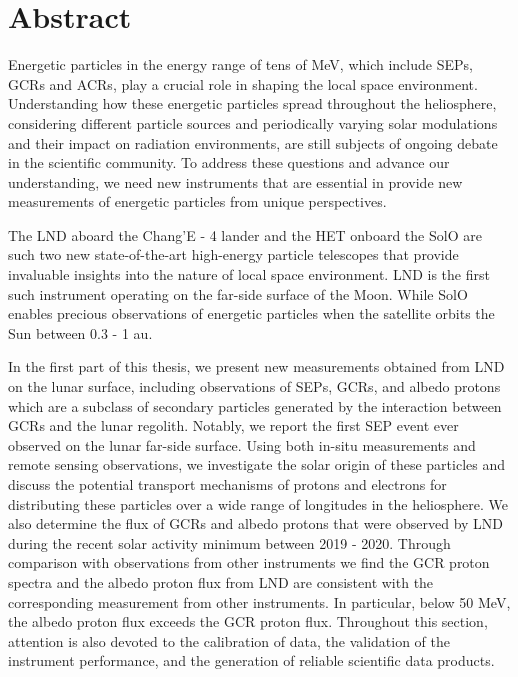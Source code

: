 \chapter*{Abstract}
Energetic particles in the energy range of tens of MeV, which include \acp{SEP}, \acp{GCR} and \acp{ACR},  play a crucial role in shaping the local space environment. Understanding how these energetic particles spread throughout the heliosphere, considering different particle sources and periodically varying solar modulations and their impact on radiation environments, are still subjects of ongoing debate in the scientific community. To address these questions and advance our understanding, we need new instruments that are essential in provide new measurements of energetic particles from unique perspectives.

The \ac{LND} aboard the Chang'E - 4 lander and the \ac{HET} onboard the \ac{SolO} are such two new state-of-the-art high-energy particle telescopes that provide invaluable insights into the nature of local space environment. \ac{LND} is the first such instrument operating on the far-side surface of the Moon. While \ac{SolO} enables precious observations of energetic particles when the satellite orbits the Sun between 0.3 - 1 au.

In the first part of this thesis, we present new measurements obtained from \ac{LND} on the lunar surface, including observations of \acp{SEP}, \acp{GCR}, and albedo protons which are a subclass of secondary particles generated by the interaction between \acp{GCR} and the lunar regolith. Notably, we report the first \ac{SEP} event ever observed on the lunar far-side surface. Using both in-situ measurements and remote sensing observations, we investigate the solar origin of these particles and discuss the potential transport mechanisms of protons and electrons for distributing these particles over a wide range of longitudes in the heliosphere. We also determine the flux of \acp{GCR} and albedo protons that were observed by \ac{LND} during the recent solar activity minimum between 2019 - 2020. Through comparison with observations from other instruments
we find the \ac{GCR} proton spectra and the albedo proton flux from \ac{LND} are consistent with the corresponding measurement from other instruments. In particular, below 50 MeV, the albedo proton ﬂux exceeds the \ac{GCR} proton ﬂux.
Throughout this section, attention is also devoted to the calibration of data, the validation of the instrument performance, and the generation of reliable scientific data products.

